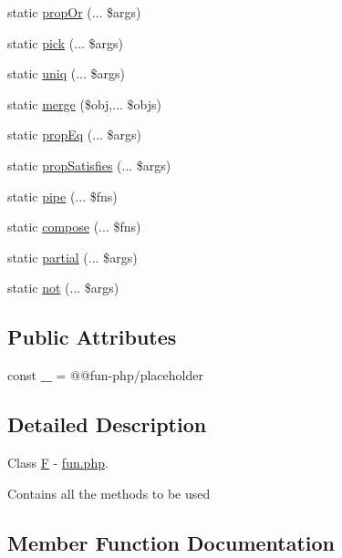 \begin{DoxyCompactItemize}
static \hyperlink{classboehm__s_1_1F_a0b5ab6c3448ef372f531576bc390d88a}{prop\+Or} (... \$args)
\item 
static \hyperlink{classboehm__s_1_1F_a1ed294c2887f1f3bb520236a993259fd}{pick} (... \$args)
\item 
static \hyperlink{classboehm__s_1_1F_a9015b4c01377f2a42e1ec9069f79d9e4}{uniq} (... \$args)
\item 
static \hyperlink{classboehm__s_1_1F_ac833c309186225e5587fd45dfef22aca}{merge} (\$obj,... \$objs)
\item 
static \hyperlink{classboehm__s_1_1F_ada046f8c33b77f3d3ca40e12bc42c5db}{prop\+Eq} (... \$args)
\item 
static \hyperlink{classboehm__s_1_1F_a6d71ddfdd2b6c90fe356808bd332bb3f}{prop\+Satisfies} (... \$args)
\item 
static \hyperlink{classboehm__s_1_1F_a353205345113144a6fd6f874097377bc}{pipe} (... \$fns)
\item 
static \hyperlink{classboehm__s_1_1F_a1712c41e5be41e6f6e2088ed5d54a864}{compose} (... \$fns)
\item 
static \hyperlink{classboehm__s_1_1F_ab29a37d2aca75028895148da5da15b4b}{partial} (... \$args)
\item 
static \hyperlink{classboehm__s_1_1F_a0cf3df6448dbfa748f755494974d13ab}{not} (... \$args)
\end{DoxyCompactItemize}
\subsection*{Public Attributes}
\begin{DoxyCompactItemize}
\item 
\mbox{\label{classboehm__s_1_1F_ab837ec3c9abe3d1a244817fd4c18eda7}} 
const {\bfseries \+\_\+} = \textquotesingle{}@@fun-\/php/placeholder\textquotesingle{}
\end{DoxyCompactItemize}


\subsection{Detailed Description}
Class \hyperlink{classboehm__s_1_1F}{F} -\/ \hyperlink{fun_8php}{fun.\+php}. 

Contains all the methods to be used 

\subsection{Member Function Documentation}
\mbox{\label{classboehm__s_1_1F_a1712c41e5be41e6f6e2088ed5d54a864}} 
